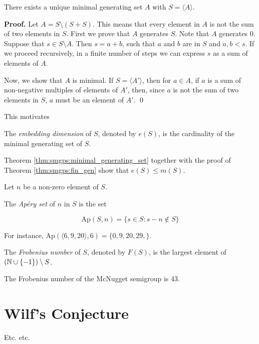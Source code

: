 \begin{theorem}\label{thm:smgps:minimal_generating_set}
     There exists a unique minimal generating set $A$ with $S = \langle A \rangle$.
\end{theorem}

\textbf{Proof. } Let $A = S \setminus(S + S)$. This means that every element in $A$ is not the sum of two elements in $S$. First we prove that $A$ generates $S$. Note that $A$ generates 0. Suppose that $s\in S \setminus A$. Then $s = a + b$, such that $a$ and $b$ are in $S$ and $a, b < s$. If we proceed recursively, in a finite number of steps we can express $s$ as a sum of elements of $A$. \par

Now, we show that $A$ is minimal. If $S = \langle A' \rangle$, then for $a \in A$, if $a$ is a sum of non-negative multiples of elements of $A'$, then, since $a$ is not the sum of two elements in $S$, $a$ must be an element of $A'$. \qed \par

This motivates \par

\begin{definition}\label{def:smgps:embedding_dim}
    The \textit{embedding dimension} of $S$, denoted by $e(S)$, is the cardinality of the minimal generating set of $S$.
\end{definition}

Theorem \ref{thm:smgps:minimal_generating_set} together with the proof of Theorem \ref{thm:smgps:fin_gen} show that $e(S) \leq m(S)$. \par

Let $n$ be a non-zero element of $S$. \par

\begin{definition}\label{def:smgps:aperyset}
    The \textit{Ap\'ery set} of $n$ in $S$ is the set
\end{definition}
\[\text{Ap}(S, n) = \{s \in S : s - n \notin S\}\]

For instance, $\text{Ap}(\langle 6, 9, 20 \rangle, 6) = \{0, 9, 20, 29, \}$. \par

\begin{definition}\label{def:smgps:frobeniusnum}
    The \textit{Frobenius number} of $S$, denoted by $F(S)$, is the largest element of $(\mathbb{N} \cup \{-1\}) \setminus S$.
\end{definition}

The Frobenius number of the McNugget semigroup is 43. \par


\begin{definition}\label{def:smgps:genus}
\end{definition}


\section{Wilf's Conjecture}\label{sec:smgps:theme2}

Etc. etc.
